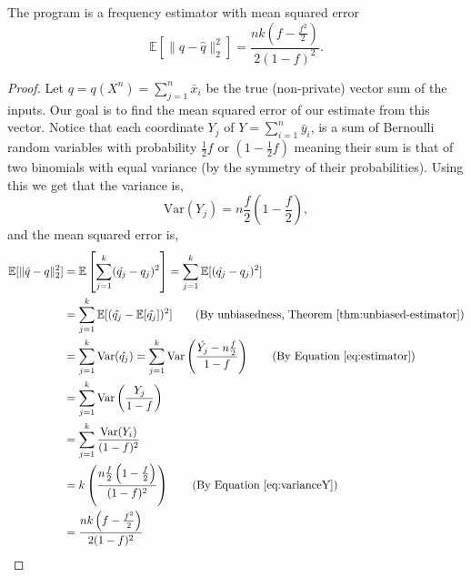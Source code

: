 \documentclass{article}
\begin{document}
\begin{theorem} 
	The program  is a frequency estimator with mean squared error 
	\begin{equation*} 
		\mathbb{E}[\|q-\hat{q}\|_2^2] = \frac{nk\left(f-\frac{f^2}{2}\right)}{2(1-f)^2}. 
	\end{equation*} 
\end{theorem} 
\begin{proof} 
    Let $q = q(X^n)=\sum\limits_{j=1}^n \bar{x}_i$ be the true (non-private) vector sum of the inputs. Our goal is to find the mean squared error of our estimate from this vector. Notice that each coordinate $Y_j$ of $Y=\sum_{i=1}^n \bar{y}_i$, is a sum of Bernoulli random variables with probability $\frac{1}{2}f$ or $(1-\frac{1}{2}f)$ meaning their sum is that of two binomials with equal variance (by the symmetry of their probabilities). Using this we get that the variance is, 
\begin{equation} 
    \text{Var}(Y_j) = n\frac{f}{2}\left(1-\frac{f}{2}\right), \label{eq:varianceY} 
\end{equation} 
and the mean squared error is, 
\begin{align*} 
    \mathbb{E}[\|\hat{q}-q\|_2^2] &= \mathbb{E}\left[\sum\limits_{j=1}^k(\hat{q_j}-q_j)^2\right] = \sum\limits_{j=1}^k\mathbb{E}[(\hat{q_j}-q_j)^2] \\ 
			&= \sum\limits_{j=1}^k\mathbb{E}[(\hat{q_j}-\mathbb{E}[\hat{q_j}])^2] \tag{By unbiasedness, Theorem~\ref{thm:unbiased-estimator}}\\ 
			&= \sum\limits_{j=1}^k\text{Var}(\hat{q_j}) = \sum\limits_{j=1}^k\text{Var}\left(\frac{\hat{Y_j}-n\frac{f}{2}}{1-f}\right) \tag{By Equation~\ref{eq:estimator}}\\ 
			&= \sum\limits_{j=1}^k\text{Var}\left(\frac{Y_j}{1-f}\right) \\ 
			&= \sum\limits_{j=1}^k\frac{\text{Var}(Y_i)}{(1-f)^2}\\ 
			&= k\left(\frac{n\frac{f}{2}\left(1-\frac{f}{2}\right)}{(1-f)^2}\right) \tag{By Equation~\ref{eq:varianceY}}\\ 
			& = \frac{nk\left(f-\frac{f^2}{2}\right)}{2(1-f)^2} 
\end{align*} 
\end{proof} 
 
 
 
\end{document}
